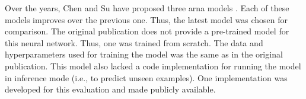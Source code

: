 
Over the years, Chen and Su have proposed three \gls{arna}
models \parencite{chen2018functional, chen2019harmony,
chen2021attend}. Each of these models improves over the
previous one. Thus, the latest model
\parencite{chen2021attend} was chosen for comparison. The
original publication does not provide a pre-trained model
for this neural network. Thus, one was trained from scratch.
The data and hyperparameters used for training the model was
the same as in the original publication. This model also
lacked a code implementation for running the model in
inference mode (i.e., to predict unseen examples). One
implementation was developed for this evaluation and made
publicly
available.
